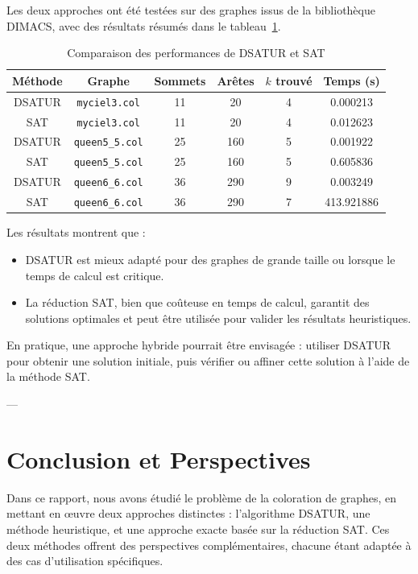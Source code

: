\documentclass[11pt]{article}
\begin{document}
Les deux approches ont été testées sur des graphes issus de la bibliothèque DIMACS, avec des résultats résumés dans le tableau~\ref{tab:comparaison}.

\begin{table}[h!]
\centering
\begin{tabular}{|c|c|c|c|c|c|}
\hline
\textbf{Méthode} & \textbf{Graphe} & \textbf{Sommets} & \textbf{Arêtes} & \textbf{\(k\) trouvé} & \textbf{Temps (s)} \\ \hline
DSATUR & \texttt{myciel3.col} & 11 & 20 & 4 & 0.000213 \\
SAT & \texttt{myciel3.col} & 11 & 20 & 4 & 0.012623 \\ \hline
DSATUR & \texttt{queen5\_5.col} & 25 & 160 & 5 & 0.001922 \\
SAT & \texttt{queen5\_5.col} & 25 & 160 & 5 & 0.605836 \\ \hline
DSATUR & \texttt{queen6\_6.col} & 36 & 290 & 9 & 0.003249 \\
SAT & \texttt{queen6\_6.col} & 36 & 290 & 7 & 413.921886 \\ \hline
\end{tabular}
\caption{Comparaison des performances de DSATUR et SAT}
\label{tab:comparaison}
\end{table}

Les résultats montrent que :
\begin{itemize}
    \item DSATUR est mieux adapté pour des graphes de grande taille ou lorsque le temps de calcul est critique.
    \item La réduction SAT, bien que coûteuse en temps de calcul, garantit des solutions optimales et peut être utilisée pour valider les résultats heuristiques.
\end{itemize}

En pratique, une approche hybride pourrait être envisagée : utiliser DSATUR pour obtenir une solution initiale, puis vérifier ou affiner cette solution à l'aide de la méthode SAT.

---

\section{Conclusion et Perspectives}

Dans ce rapport, nous avons étudié le problème de la coloration de graphes, en mettant en œuvre deux approches distinctes : l'algorithme DSATUR, une méthode heuristique, et une approche exacte basée sur la réduction SAT. Ces deux méthodes offrent des perspectives complémentaires, chacune étant adaptée à des cas d'utilisation spécifiques.
\end{document}
